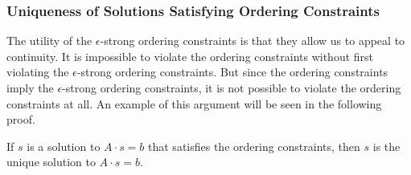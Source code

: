 \documentclass{patmorin}
\begin{document}
\subsubsection{Uniqueness of Solutions Satisfying Ordering Constraints}

The utility of the $\epsilon$-strong ordering constraints is that they
allow us to appeal to continuity. It is impossible 
to violate
the ordering constraints without first violating the
 $\epsilon$-strong ordering constraints.
But since the ordering constraints imply the
 $\epsilon$-strong ordering constraints,
it is not possible
to violate
the ordering constraints at all.
An example of this argument will be seen in the following proof.

\begin{lem}
   If $s$ is a solution to $A\cdot s=b$ that satisfies the ordering
   constraints, %
then $s$ is 
   the unique solution to $A\cdot s=b$.
\end{lem}
\end{document}
